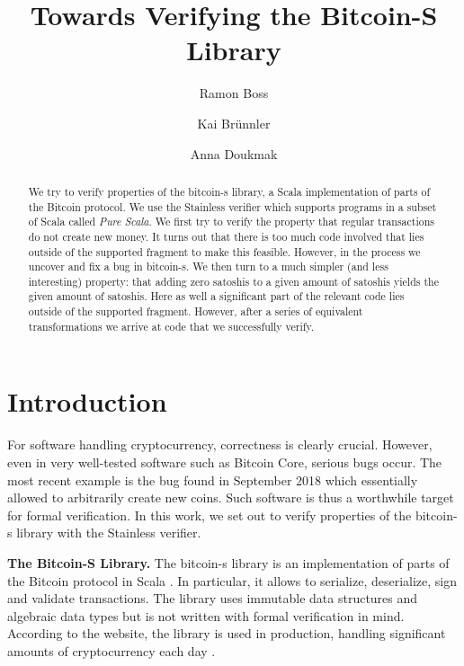 \documentclass[runningheads]{llncs}
\renewcommand{\paragraph}{\textbf}%
\begin{document}
\title{Towards Verifying the Bitcoin-S Library}

\author{Ramon Boss \and Kai Brünnler \and Anna Doukmak}


\maketitle             

\begin{abstract}
  We try to verify properties of the bitcoin-s library, a Scala
  implementation of parts of the Bitcoin protocol. We use the
  Stainless verifier which supports programs in a subset of Scala
  called \emph{Pure Scala}. We first try to verify the property that
  regular transactions do not create new money. It turns out that
  there is too much code involved that lies outside of the supported
  fragment to make this feasible. However, in the process we uncover
  and fix a bug in bitcoin-s. We then turn to a much simpler (and less
  interesting) property: that adding zero satoshis to a given amount
  of satoshis yields the given amount of satoshis. Here as well a
  significant part of the relevant code lies outside of the supported
  fragment. However, after a series of equivalent transformations we
  arrive at code that we successfully verify.

\end{abstract}



\section{Introduction}

For software handling cryptocurrency, correctness is clearly crucial.
However, even in very well-tested software such as Bitcoin Core,
serious bugs occur. The most recent example is the bug found in
September 2018 \cite{cve201817144} which essentially allowed to
arbitrarily create new coins. Such software is thus a worthwhile
target for formal verification. In this work, we set out to verify
properties of the bitcoin-s library with the Stainless verifier.

\paragraph{The Bitcoin-S Library.} The bitcoin-s library is an
implementation of parts of the Bitcoin protocol in Scala
\cite{BitcoinS:website,BitcoinS:github}. In particular, it allows to
serialize, deserialize, sign and validate transactions. The library
uses immutable data structures and algebraic data types but is not
written with formal verification in mind. According to the website,
the library is used in production, handling significant amounts of
cryptocurrency each day \cite{BitcoinS:website}.
\end{document}
